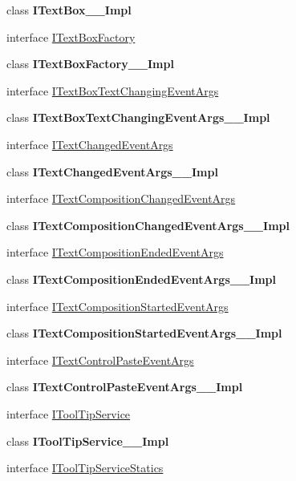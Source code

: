 \begin{DoxyCompactItemize}
class {\bfseries I\+Text\+Box\+\_\+\+\_\+\+Impl}
\item 
interface \hyperlink{interface_windows_1_1_u_i_1_1_xaml_1_1_controls_1_1_i_text_box_factory}{I\+Text\+Box\+Factory}
\item 
class {\bfseries I\+Text\+Box\+Factory\+\_\+\+\_\+\+Impl}
\item 
interface \hyperlink{interface_windows_1_1_u_i_1_1_xaml_1_1_controls_1_1_i_text_box_text_changing_event_args}{I\+Text\+Box\+Text\+Changing\+Event\+Args}
\item 
class {\bfseries I\+Text\+Box\+Text\+Changing\+Event\+Args\+\_\+\+\_\+\+Impl}
\item 
interface \hyperlink{interface_windows_1_1_u_i_1_1_xaml_1_1_controls_1_1_i_text_changed_event_args}{I\+Text\+Changed\+Event\+Args}
\item 
class {\bfseries I\+Text\+Changed\+Event\+Args\+\_\+\+\_\+\+Impl}
\item 
interface \hyperlink{interface_windows_1_1_u_i_1_1_xaml_1_1_controls_1_1_i_text_composition_changed_event_args}{I\+Text\+Composition\+Changed\+Event\+Args}
\item 
class {\bfseries I\+Text\+Composition\+Changed\+Event\+Args\+\_\+\+\_\+\+Impl}
\item 
interface \hyperlink{interface_windows_1_1_u_i_1_1_xaml_1_1_controls_1_1_i_text_composition_ended_event_args}{I\+Text\+Composition\+Ended\+Event\+Args}
\item 
class {\bfseries I\+Text\+Composition\+Ended\+Event\+Args\+\_\+\+\_\+\+Impl}
\item 
interface \hyperlink{interface_windows_1_1_u_i_1_1_xaml_1_1_controls_1_1_i_text_composition_started_event_args}{I\+Text\+Composition\+Started\+Event\+Args}
\item 
class {\bfseries I\+Text\+Composition\+Started\+Event\+Args\+\_\+\+\_\+\+Impl}
\item 
interface \hyperlink{interface_windows_1_1_u_i_1_1_xaml_1_1_controls_1_1_i_text_control_paste_event_args}{I\+Text\+Control\+Paste\+Event\+Args}
\item 
class {\bfseries I\+Text\+Control\+Paste\+Event\+Args\+\_\+\+\_\+\+Impl}
\item 
interface \hyperlink{interface_windows_1_1_u_i_1_1_xaml_1_1_controls_1_1_i_tool_tip_service}{I\+Tool\+Tip\+Service}
\item 
class {\bfseries I\+Tool\+Tip\+Service\+\_\+\+\_\+\+Impl}
\item 
interface \hyperlink{interface_windows_1_1_u_i_1_1_xaml_1_1_controls_1_1_i_tool_tip_service_statics}{I\+Tool\+Tip\+Service\+Statics}

\end{DoxyCompactItemize}
